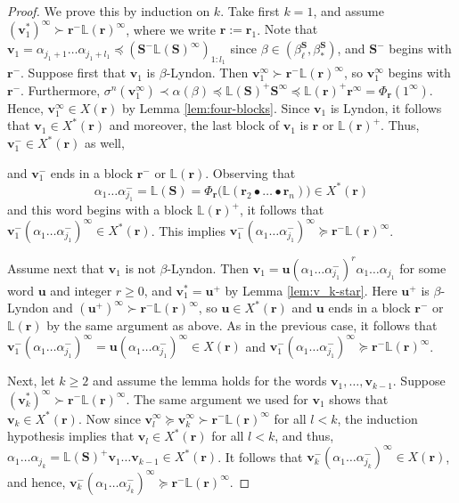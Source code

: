 \documentclass[11pt]{amsart}
\theoremstyle{definition}
\theoremstyle{remark}
\numberwithin{equation}{section}
\renewcommand{\L}{\ensuremath{\mathbb{L}}}
\newcommand{\cs}{ {\mathbf{S}}}
\renewcommand{\r}{ {\mathbf{r}}}
\renewcommand{\u}{\mathbf{u}}
\renewcommand{\v}{\mathbf{v}}
\newcommand{\f}{\infty}
\newcommand{\al}{\alpha}
\newcommand{\lle}{\preccurlyeq}
\newcommand{\lge}{\succcurlyeq}
\newcommand{\si}{\sigma}
\begin{document}
\begin{proof}
We prove this by induction on $k$. Take first $k=1$, and assume $(\v_1^*)^\f\succ \r^-\L(\r)^\f$, where we write $\r:=\r_1$. 
{Note that $\v_1=\al_{j_1+1}\dots\al_{j_1+l_1}\lle (\cs^-\L(\cs)^\f)_{1:l_1}$ since $\beta\in(\beta_\ell^\cs,\beta_*^\cs)$, and $\cs^-$ begins with $\r^-$.
Suppose first that $\v_1$ is $\beta$-Lyndon. Then $\v_1^\f\succ \r^-\L(\r)^\f$, so $\v_1^\f$ begins with $\r^-$. Furthermore, $\si^n(\v_1^\f)\prec\al(\beta)\lle \L(\cs)^+\cs^\f\lle \L(\r)^+\r^\f=\Phi_\r(1^\f)$. Hence,} $\v_1^\f\in X(\r)$ by Lemma \ref{lem:four-blocks}. {Since $\v_1$ is Lyndon, it follows that $\v_1\in X^*(\r)$ and moreover, the last block of $\v_1$ is $\r$ or $\L(\r)^+$. Thus,} $\v_1^-\in X^*(\r)$ as well, {and $\v_1^-$ ends in a block $\r^-$ or $\L(\r)$. Observing that
\[
\al_1\dots\al_{j_1}^-=\L(\cs)=\Phi_\r\big(\L(\r_2\bullet\dots\bullet\r_n)\big)\in X^*(\r)
\]
and this word begins with a block $\L(\r)^+$,
it follows that $\v_1^-(\al_1\dots\al_{j_1}^-)^\f\in X^*(\r)$. This implies $\v_1^-(\al_1\dots\al_{j_1}^-)^\f\lge \r^-\L(\r)^\f$.

Assume next that $\v_1$ is not $\beta$-Lyndon. Then $\v_1=\u(\al_1\dots\al_{j_1}^-)^r\al_1\dots\al_{j_1}$ for some word $\u$ and integer $r\geq 0$, and $\v_1^*=\u^+$ by Lemma \ref{lem:v_k-star}. Here $\u^+$ is $\beta$-Lyndon and $(\u^+)^\f\succ \r^-\L(\r)^\f$, so $\u\in X^*(\r)$ and $\u$ ends in a block $\r^-$ or $\L(\r)$ by the same argument as above. As in the previous case, it follows that $\v_1^-(\al_1\dots\al_{j_1}^-)^\f=\u(\al_1\dots\al_{j_1}^-)^\f\in X(\r)$ and $\v_1^-(\al_1\dots\al_{j_1}^-)^\f\lge \r^-\L(\r)^\f$.}


Next, let $k\geq 2$ and assume the lemma holds for the words $\v_1,\dots,\v_{k-1}$. Suppose $(\v_k^*)^\f\succ \r^-\L(\r)^\f$. The same argument we used for $\v_1$ shows that $\v_k\in X^*(\r)$. Now since $\v_l^\f{\lge}\v_k^\f\succ \r^-\L(\r)^\f$ for all $l<k$, the induction hypothesis implies that $\v_l\in X^*(\r)$ for all $l<k$, and thus, $\al_1\dots\al_{j_k}=\L(\cs)^+\v_1\dots\v_{k-1}\in X^*(\r)$. It follows that $\v_k^-(\al_1\dots\al_{j_k}^-)^\f\in X(\r)$, and hence, $\v_k^-(\al_1\dots\al_{j_k}^-)^\f\lge \r^-\L(\r)^\f$.
\end{proof}
\end{document}

